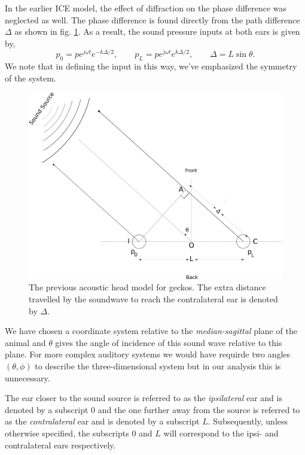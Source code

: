 In the earlier ICE model, the effect of diffraction on the phase difference was neglected as well. The phase difference
is found directly from the path difference $\Delta$ as shown in fig. \ref{fig:oldheadmodel}.
As a result, the sound pressure inputs at both ears is given by,
\begin{equation}\label{oldsoundinput}
p_0=pe^{j\omega t} e^{-k\Delta/2},\qquad p_L=pe^{j\omega t} e^{k\Delta/2},\qquad \Delta=L\sin\theta.
\end{equation}
We note that in defining the input in this way, we've emphasized the symmetry of the system.
\begin{figure}[ht]
 \includegraphics[width=.75\linewidth]{Diagrams/acousticheadmodelold.png}
 \caption[Previous acoustic head model for geckos]{The previous acoustic head model for geckos. The extra distance travelled by the soundwave to reach the contralateral ear 
 is denoted by $\Delta$.}
 \label{fig:oldheadmodel}
\end{figure}
We have chosen a coordinate
system relative to the \textit{median-sagittal} plane of the animal and $\theta$ gives the angle of incidence of this
sound wave relative to this plane. For more complex auditory systems we would have requirde two angles $(\theta, \phi)$ to describe
the three-dimensional system but in our analysis this is unnecessary.

The ear closer to the sound source is referred to as the \textit{ipsilateral} ear and
is denoted by a subscript $0$ and the one further away from the source is referred to as the \textit{contralateral} ear and is denoted by a subscript $L$. 
Subsequently, unless otherwise specified, the subscripts $0$ and $L$ will correspond to the ipsi- and contralateral ears respectively.

